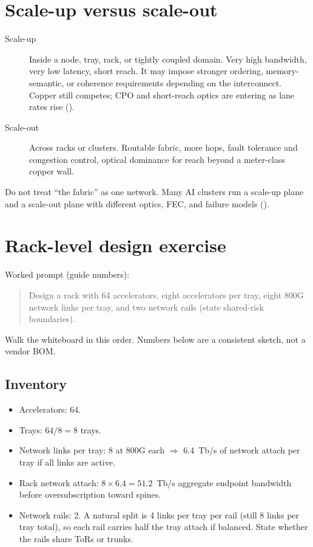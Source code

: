 \section{Scale-up versus scale-out}
\label{sec:hpc-scale}

\begin{description}
\item[Scale-up] Inside a node, tray, rack, or tightly coupled domain. Very high
      bandwidth, very low latency, short reach. It may impose stronger ordering,
      memory-semantic, or coherence requirements depending on the interconnect.
      Copper still competes; CPO and short-reach optics are entering as lane
      rates rise ().
\item[Scale-out] Across racks or clusters. Routable fabric, more hops, fault
      tolerance and congestion control, optical dominance for reach beyond a
      meter-class copper wall.
\end{description}

Do not treat ``the fabric'' as one network. Many AI clusters run a scale-up
plane and a scale-out plane with different optics, FEC, and failure models
().

\section{Rack-level design exercise}
\label{sec:hpc-rack-exercise}

Worked prompt (guide numbers):

\begin{quote}
\noindent Design a rack with 64 accelerators, eight accelerators per tray,
eight 800G network links per tray, and two network rails (state shared-risk
boundaries).
\end{quote}

Walk the whiteboard in this order. Numbers below are a consistent sketch, not a
vendor BOM.

\subsection{Inventory}
\label{sec:hpc-rack-inventory}

\begin{itemize}
\item Accelerators: 64.
\item Trays: $64/8 = 8$ trays.
\item Network links per tray: 8 at 800G each $\Rightarrow$ 6.4~Tb/s of
      network attach per tray if all links are active.
\item Rack network attach: $8\times 6.4 = 51.2$~Tb/s aggregate endpoint
      bandwidth before oversubscription toward spines.
\item Network rails: 2. A natural split is 4 links per tray per rail (still 8
      links per tray total), so each rail carries half the tray attach if
      balanced. State whether the rails share ToRs or trunks.
\end{itemize}

